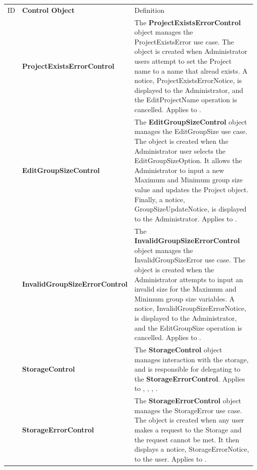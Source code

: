 \documentclass[12pt,letterpaper]{article}
\begin{document}
\begin{center}
\begin{tabu} to 
		\tableheader{}ID & Control Object & Definition\\
		 & Project\-Exists\-Error\-Control & The {\bf ProjectExistsErrorControl} object manages the ProjectExistsError use case. The object is created when Administrator users attempt to set the Project name to a name that alread exists. A notice, ProjectExistsErrorNotice, is displayed to the Administrator, and the EditProjectName operation is cancelled. Applies to . \\
		
		 & Edit\-Group\-Size\-Control & The {\bf EditGroupSizeControl} object manages the EditGroupSize use case. The object is created when the Administrator user selects the EditGroupSizeOption. It allows the Administrator to input a new Maximum and Minimum group size value and updates the Project object. Finally, a notice, GroupSizeUpdateNotice, is displayed to the Administrator. Applies to . \\
		
		 & Invalid\-Group\-Size\-Error\-Control & The {\bf InvalidGroupSizeErrorControl} object manages the InvalidGroupSizeError use case. The object is created when the Administrator attempts to input an invalid size for the Maximum and Minimum group size variables. A notice, InvalidGroupSizeErrorNotice, is displayed to the Administrator, and the EditGroupSize operation is cancelled. Applies to . \\
		
		 & Storage\-Control & The {\bf StorageControl} object manages interaction with the storage, and is responsible for delegating to the \textbf{StorageErrorControl}. Applies to , , , . \\
		
		 & Storage\-Error\-Control & The {\bf StorageErrorControl} object manages the StorageError use case. The object is created when any user makes a request to the Storage and the request cannot be met. It then displays a notice, StorageErrorNotice, to the user. Applies to . \\


\end{tabu}
\end{center}
\end{document}
